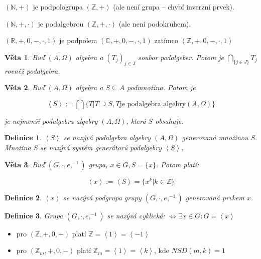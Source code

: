 \documentclass[a4paper, 11pt]{report}
\newtheorem{mydef}{Definice}[chapter]
\newtheorem{veta}{Věta}
\begin{document}
$(\mathbb{N}, +)$ je podpologrupa $(\mathbb{Z}, +)$ (ale není grupa -- chybí inverzní prvek).

$(\mathbb{N}, +, \cdot)$ je podalgebrou $(\mathbb{Z}, +, \cdot)$ (ale není podokruhem).

$(\mathbb{R}, +, 0, -, \cdot, 1)$ je podpolem $(\mathbb{C}, +, 0, -,\cdot, 1)$ zatímco $(\mathbb{Z}, +, 0, -,\cdot, 1)$

\begin{veta}
Buď $(A, \Omega)$ algebra a $(T_j)_{j \in J}$ soubor podalgeber. Potom je $\bigcap_{\{j \in J\}} T_j$ rovněž podalgebra.
\end{veta}

\begin{veta}
Buď $(A, \Omega)$ algebra a $S \subseteq A$ podmnožina. Potom je

$$\left< S \right> := \bigcap\{T | T \supseteq S, T \text{je podalgebra algebry} (A, \Omega)\}$$

je nejmenší podalgebra algebry $(A, \Omega)$, která $S$ obsahuje.
\end{veta}

\begin{mydef}
$\left< S \right>$ se nazývá podalgebra algebry $(A, \Omega)$ generovaná množinou $S$. Množina $S$ se nazývá systém generátorů podalgebry $\left< S \right>$.
\end{mydef}

\begin{veta}
Buď $(G, \cdot, e, ^{-1})$ grupa, $x \in G, S = \{x\}$. Potom platí:

$$\left< x \right> := \left< S \right> = \{x^k | k \in \mathbb{Z}\}$$
\end{veta}

\begin{mydef}
$\left< x \right>$ se nazývá podgrupa grupy $(G, \cdot, e, ^{-1})$ generovaná prvkem $x$.
\end{mydef}

\begin{mydef}
Grupa $(G, \cdot, e, ^{-1})$ se nazývá cyklická: $\Leftrightarrow \exists x \in G: G = \left< x \right>$
\end{mydef}

\begin{itemize}
	\item pro $(\mathbb{Z}, +, 0, -)$ platí $\mathbb{Z} = \left< 1 \right> = \left< -1 \right>$
	\item pro $(\mathbb{Z}_m, +, 0, -)$ platí $\mathbb{Z}_m = \left< 1 \right> = \left< k \right>$, kde $NSD(m, k) = 1$
\end{itemize}
\end{document}
